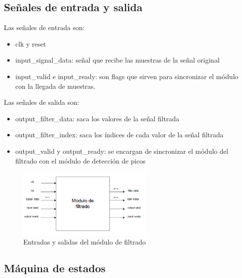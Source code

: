 \subsection{Señales de entrada y salida}

Las señales de entrada son:

\begin{itemize}
\item clk y reset
\item input\_signal\_data: señal que recibe las muestras de la señal original 
\item input\_valid e input\_ready: son flags que sirven para sincronizar el módulo con la llegada de muestras. 
\end{itemize}

Las señales de salida son:

\begin{itemize}
    \item output\_filter\_data: saca los valores de la señal filtrada
    \item output\_filter\_index: saca los índices de cada valor de la señal filtrada
    \item output\_valid y output\_ready: se encargan de sincronizar el módulo del filtrado 
    con el módulo de detección de picos
\end{itemize}

\begin{figure}[h!]
    \centering
    \includegraphics[width=0.6\textwidth]{./Images/img_implementacion_hw/diagramamodulofiltrado.png}
    \caption{Entradas y salidas del módulo de filtrado}
    \label{fig:modfiltrado}
\end{figure} 

\subsection{Máquina de estados}

